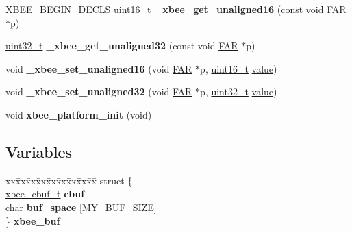 \begin{DoxyCompactItemize}
\mbox{\label{group__hal__kl25_ga3c28867722588bbce19f48619a686aa5}} 
\hyperlink{group__hal_ga336bff4f4a6012aacc4468132bbd3d7f}{X\+B\+E\+E\+\_\+\+B\+E\+G\+I\+N\+\_\+\+D\+E\+C\+LS} \hyperlink{group__hal__dos_ga5a8b2dc9e45a9ee81a94ef304fb62505}{uint16\+\_\+t} {\bfseries \+\_\+xbee\+\_\+get\+\_\+unaligned16} (const void \hyperlink{group__hal_gaef060b3456fdcc093a7210a762d5f2ed}{F\+AR} $\ast$p)
\item 
\mbox{\label{group__hal__kl25_ga3cc521904fd5767c0507d3ba1edf7fa9}} 
\hyperlink{group__hal__dos_ga09a1e304d66d35dd47daffee9731edaa}{uint32\+\_\+t} {\bfseries \+\_\+xbee\+\_\+get\+\_\+unaligned32} (const void \hyperlink{group__hal_gaef060b3456fdcc093a7210a762d5f2ed}{F\+AR} $\ast$p)
\item 
\mbox{\label{group__hal__kl25_gaeb0e009ab2cb29eecfcc690abc65aabd}} 
void {\bfseries \+\_\+xbee\+\_\+set\+\_\+unaligned16} (void \hyperlink{group__hal_gaef060b3456fdcc093a7210a762d5f2ed}{F\+AR} $\ast$p, \hyperlink{group__hal__dos_ga5a8b2dc9e45a9ee81a94ef304fb62505}{uint16\+\_\+t} \hyperlink{group__zcl_ga1ed5b151a90f7e99af8cca2e6875ddf4}{value})
\item 
\mbox{\label{group__hal__kl25_gaae24dc98d36feec7a17aad989a9bf91f}} 
void {\bfseries \+\_\+xbee\+\_\+set\+\_\+unaligned32} (void \hyperlink{group__hal_gaef060b3456fdcc093a7210a762d5f2ed}{F\+AR} $\ast$p, \hyperlink{group__hal__dos_ga09a1e304d66d35dd47daffee9731edaa}{uint32\+\_\+t} \hyperlink{group__zcl_ga1ed5b151a90f7e99af8cca2e6875ddf4}{value})
\item 
\mbox{\label{group__hal__kl25_ga4bbae3bd7c4c424b964b8db9448127fd}} 
void {\bfseries xbee\+\_\+platform\+\_\+init} (void)
\end{DoxyCompactItemize}
\subsection*{Variables}
\begin{DoxyCompactItemize}
\item 
\mbox{\label{group__hal__kl25_ga3d695999a45f7807b27e4cf1d949727e}} 
\begin{tabbing}
xx\=xx\=xx\=xx\=xx\=xx\=xx\=xx\=xx\=\kill
struct \{\\
\>\hyperlink{structxbee__cbuf__t}{xbee\_cbuf\_t} {\bfseries cbuf}\\
\>char {\bfseries buf\_space} \mbox{[}MY\_BUF\_SIZE\mbox{]}\\
\} {\bfseries xbee\_buf}\\

\end{tabbing}\end{DoxyCompactItemize}


